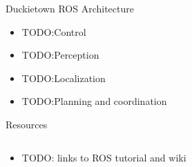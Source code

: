 \documentclass{beamer}
\begin{document}
\begin{frame}{Duckietown ROS Architecture}
\begin{itemize}
	\item TODO:Control
	\item TODO:Perception
	\item TODO:Localization
	\item TODO:Planning and coordination
\end{itemize}
\end{frame}


\begin{frame}{Resources}
  \begin{columns}
    \begin{column}{0.6\textwidth}
      \begin{itemize}
        \item TODO: links to ROS tutorial and wiki
      \end{itemize}
    \end{column}
  \begin{column}{0.4\textwidth}
    \centering
    \end{column}
  \end{columns}
\end{frame}

\end{document}
